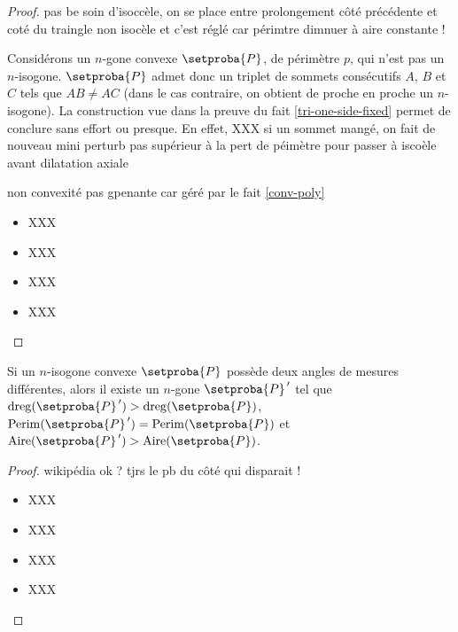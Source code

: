 \begin{proof}
	pas be soin d'isoccèle, on se place entre prolongement côté précédente et coté du traingle non isocèle et c'est réglé car périmtre dimnuer à aire constante !
	
	
	Considérons un $n$-gone convexe $\setproba{P}$, de périmètre $p$, qui n'est pas un $n$-isogone. 
	$\setproba{P}$ admet donc un triplet de sommets consécutifs $A$, $B$ et $C$ tels que $AB \neq AC$ (dans le cas contraire, on obtient de proche en proche un $n$-isogone).
	La construction vue dans la preuve du fait \ref{tri-one-side-fixed} permet de conclure sans effort ou presque.
	En effet,
	XXX
	si un sommet mangé, on fait de nouveau mini perturb pas supérieur à la pert de péimètre pour passer à iscoèle avant dilatation axiale
	
	non convexité pas gpenante car géré par le fait \ref{conv-poly}
	\begin{itemize}
		\item XXX

		\item XXX

		\item XXX

		\item XXX
	\end{itemize}
\end{proof}




\begin{fact} \label{almost-reg-poly}
	Si un $n$-isogone convexe $\setproba{P}$ possède deux angles de mesures différentes,
	alors il existe un $n$-gone $\setproba{P}^{\,\prime}$ tel que 
	$\degreg{\setproba{P}^{\,\prime}} > \degreg{\setproba{P}}$,
	$\perim{\setproba{P}^{\,\prime}} = \perim{\setproba{P}}$ 
	et 
	$\area{\setproba{P}^{\,\prime}} > \area{\setproba{P}}$.
\end{fact}


\begin{proof}
	wikipédia ok ? tjrs le pb du côté qui disparait !
	\begin{itemize}
		\item XXX

		\item XXX

		\item XXX

		\item XXX
	\end{itemize}
\end{proof}


